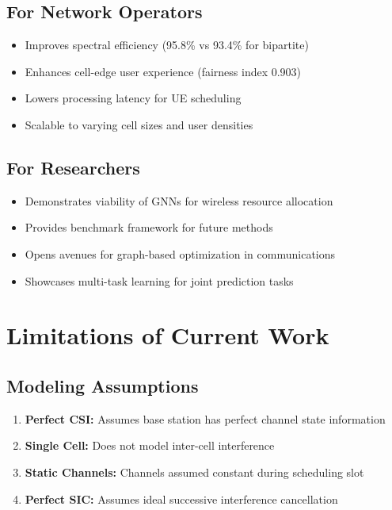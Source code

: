 \subsection{For Network Operators}
\begin{itemize}
    \item Improves spectral efficiency (95.8\% vs 93.4\% for bipartite)
    \item Enhances cell-edge user experience (fairness index 0.903)
    \item Lowers processing latency for UE scheduling
    \item Scalable to varying cell sizes and user densities
\end{itemize}

\subsection{For Researchers}
\begin{itemize}
    \item Demonstrates viability of GNNs for wireless resource allocation
    \item Provides benchmark framework for future methods
    \item Opens avenues for graph-based optimization in communications
    \item Showcases multi-task learning for joint prediction tasks
\end{itemize}

\section{Limitations of Current Work}

\subsection{Modeling Assumptions}
\begin{enumerate}
    \item \textbf{Perfect CSI:} Assumes base station has perfect channel state information
    \item \textbf{Single Cell:} Does not model inter-cell interference
    \item \textbf{Static Channels:} Channels assumed constant during scheduling slot
    \item \textbf{Perfect SIC:} Assumes ideal successive interference cancellation
\end{enumerate}

